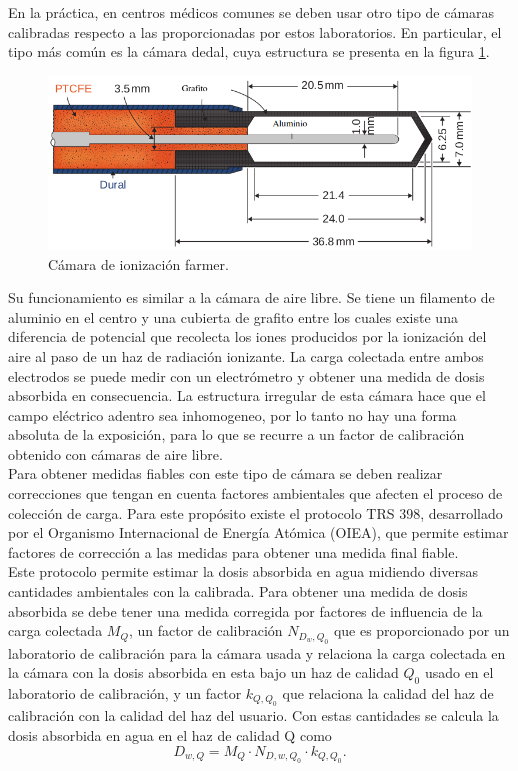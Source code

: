 En la práctica, en centros médicos comunes se deben usar otro tipo de cámaras calibradas respecto a las proporcionadas por estos laboratorios. En particular, el tipo más común es la cámara dedal, cuya estructura se presenta en la figura \ref{fig:farmer}.\\

\begin{figure}[H]
	\centering
	\includegraphics[width=0.7\linewidth]{images/camaraIoni.png}
	\caption{Cámara de ionización farmer\cite{khan2014the}.}
	\label{fig:farmer}
\end{figure}

Su funcionamiento es similar a la cámara de aire libre. Se tiene un filamento de aluminio en el centro y una cubierta de grafito entre los cuales existe una diferencia de potencial que recolecta los iones producidos por la ionización del aire al paso de un haz de radiación ionizante. La carga colectada entre ambos electrodos se puede medir con un electrómetro y obtener una medida de dosis absorbida en consecuencia. La estructura irregular de esta  cámara hace que el campo eléctrico adentro sea inhomogeneo, por lo tanto no hay una forma absoluta de la exposición, para lo que se recurre a un factor de calibración obtenido con cámaras de aire libre.\\

Para obtener medidas fiables con este tipo de cámara se deben realizar correcciones que tengan en cuenta factores ambientales que afecten el proceso de colección de carga. Para este propósito existe el protocolo TRS 398, desarrollado por el Organismo Internacional de Energía Atómica (OIEA), que permite estimar factores de corrección a las medidas para obtener una medida final fiable.\\

Este protocolo permite estimar la dosis absorbida en agua midiendo diversas cantidades ambientales con la calibrada. Para obtener una medida de dosis absorbida se debe tener una medida corregida por factores de influencia de la carga colectada $M_{Q}$, un factor de calibración $N_{D_{w},Q_{0}}$ que es proporcionado por un laboratorio de calibración para la cámara usada y relaciona la carga colectada en la cámara con la dosis absorbida en esta bajo un haz de calidad $Q_0$ usado en el laboratorio de calibración, y un factor $k_{Q,Q_{0}}$ que relaciona la calidad del haz de calibración con la calidad del haz del usuario. Con estas cantidades se calcula la dosis absorbida en agua en el haz de calidad Q como
\begin{equation}
D_{w,Q}=M_{Q}\cdot N_{D,w,Q_{0}}\cdot k_{Q,Q_{0}}.
\end{equation}

